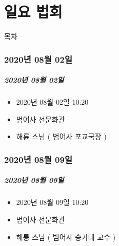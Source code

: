 \documentclass[aspectratio=1610,14pt,xcolor=pdftex,dvipsnames,table,handout]{beamer}
\begin{document}
		\part{ 일요 법회 }
		\frame{\partpage}
		
		\begin{frame} [plain]{목차}
		\tableofcontents%
		\end{frame}
		

	
		\begin{frame} [c]
		\section{2020년 08월 02일}						
		\frametitle{2020년 08월 02일}						

			\setlength{\leftmargini}{5em}			
			\begin{itemize}
				\item [일시]	2020년 08월 02일 10:20
				\item [징소]	범어사 선문화관
				\item [법문]	해륜 스님 ( 범어사 포교국장 )
			\end{itemize}
							
		\end{frame}						



		\begin{frame} [c]
		\section{2020년 08월 09일}						
		\frametitle{2020년 08월 09일}						

			\setlength{\leftmargini}{5em}			
			\begin{itemize}
				\item [일시]	2020년 08월 09일 10:20
				\item [징소]	범어사 선문화관
				\item [법문]	해룡 스님 ( 범어사 승가대 교수 )
			\end{itemize}
							
		\end{frame}						
\end{document}
